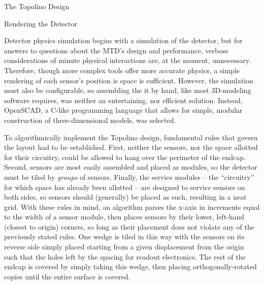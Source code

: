 \documentclass[oneside,12pt,final]{sty/ucthesis-CA2012}
\begin{document}
\begin{mainmatter}
\begin{section}{The Topolino Design}
\end{section}

\begin{section}{Rendering the Detector}

Detector physics simulation begins with a simulation of the detector, but for answers to questions about the MTD's design and performance, verbose considerations of minute physical interactions are, at the moment, unnecessary. Therefore, though more complex tools offer more accurate physics, a simple rendering of each sensor's position is space is sufficient. However, the simulation must also be configurable, so assembling the it by hand, like most 3D-modeling software requires, was neither an entertaining, nor efficient solution. Instead, OpenSCAD, a C-like programming language that allows for simple, modular construction of three-dimensional models, was selected.

To algorithmically implement the Topolino design, fundamental rules that govern the layout had to be established. First, neither the sensors, nor the space allotted for their circuitry, could be allowed to hang over the perimeter of the endcap. Second, sensors are most easily assembled and placed as modules, so the detector must be tiled by \textit{groups} of sensors. Finally, the service modules -- the ``circuitry'' for which space has already been allotted -- are designed to service sensors on both sides, so sensors should (generally) be placed as such, resulting in a neat grid. With these rules in mind, an algorithm parses the x-axis in increments equal to the width of a sensor module, then places sensors by their lower, left-hand (closest to origin) corners, so long as their placement does not violate any of the previously stated rules. One wedge is tiled in this way with the sensors on its reverse side simply placed starting from a given displacement from the origin such that the holes left by the spacing for readout electronics. The rest of the endcap is covered by simply taking this wedge, then placing orthogonally-rotated copies until the entire surface is covered.


\end{section}
\end{mainmatter}
\end{document}
